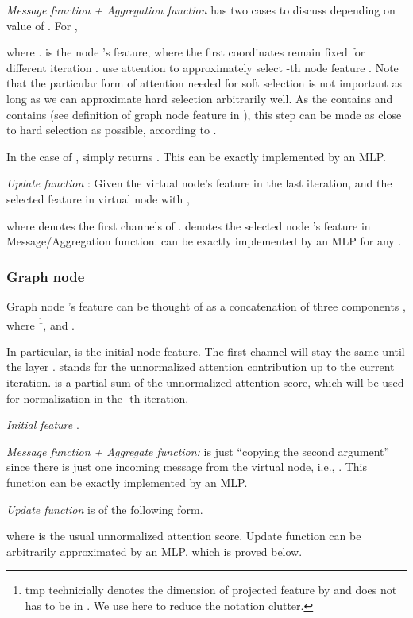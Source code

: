\documentclass[nohyperref]{article}
\theoremstyle{plain}
\theoremstyle{definition}
\theoremstyle{remark}
\newcommand\tmp{\textsf{tmp}}
\begin{document}
\emph{Message function + Aggregation function}  has two cases to discuss depending on value of . For ,


 where .  is the node 's feature, where the first  coordinates remain fixed for different iteration . 
 use attention  to approximately select -th node feature . 
Note that the particular form of attention  needed for soft selection is not important as long as we can approximate hard selection arbitrarily well. As the  contains  and  contains  (see definition of graph node feature in ),  this step can be made as close to hard selection as possible, according to . 

In the case of ,
 simply returns . This can be exactly implemented by an MLP. 

\emph{Update function }:
Given the virtual node's feature in the last iteration, and the selected feature in virtual node  with ,

where  denotes the first  channels of .  denotes the selected node 's feature in Message/Aggregation function. 
 can be exactly implemented by an MLP for any . 


\subsubsection{Graph node}\label{subsubsec-gn}
Graph node 's feature  can be thought of as a concatenation of three components , where  \footnote{\tmp{} technicially denotes the dimension of projected feature by  and does not has to be in . We use  here to reduce the notation clutter.}, and . 

In particular,  is the initial node feature. The first  channel will stay the same until the layer .  stands for the unnormalized attention contribution up to the current iteration.  is a partial sum of the unnormalized attention score, which will be used for normalization in the -th iteration. 

\emph{Initial feature} .

\emph{Message function + Aggregate function:
}
is just ``copying the second argument'' since there is just one incoming message from the virtual node, i.e., . This function can be exactly implemented by an MLP. 

\emph{Update function}
 is of the following form. 

where  is the usual unnormalized attention score. Update function  can be arbitrarily approximated by an MLP, which is proved below. 
\end{document}

